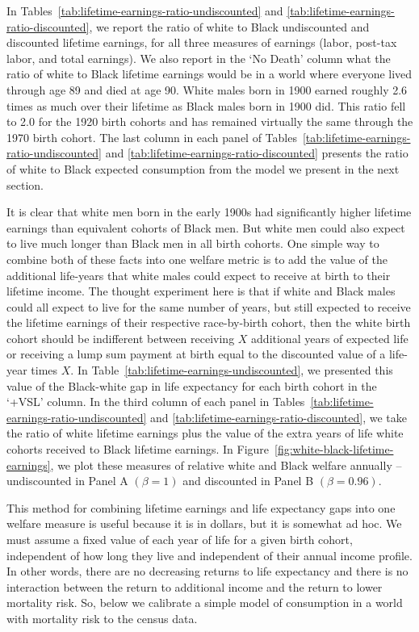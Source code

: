 \documentclass[12pt]{article}
\begin{document}
In Tables~\ref{tab:lifetime-earnings-ratio-undiscounted} and \ref{tab:lifetime-earnings-ratio-discounted}, we report the ratio of white to Black undiscounted and discounted lifetime earnings, for all three measures of earnings (labor, post-tax labor, and total earnings). 
We also report in the `No Death' column what the ratio of white to Black lifetime earnings would be in a world where everyone lived through age 89 and died at age 90. 
White males born in 1900 earned roughly 2.6 times as much over their lifetime as Black males born in 1900 did. 
This ratio fell to 2.0 for the 1920 birth cohorts and has remained virtually the same through the 1970 birth cohort. 
The last column in each panel of Tables~\ref{tab:lifetime-earnings-ratio-undiscounted} and \ref{tab:lifetime-earnings-ratio-discounted} presents the ratio of white to Black expected consumption from the model we present in the next section.

It is clear that white men born in the early 1900s had significantly higher lifetime earnings than equivalent cohorts of Black men. 
But white men could also expect to live much longer than Black men in all birth cohorts. 
One simple way to combine both of these facts into one welfare metric is to add the value of the additional life-years that white males could expect to receive at birth to their lifetime income. 
The thought experiment here is that if white and Black males could all expect to live for the same number of years, but still expected to receive the lifetime earnings of their respective race-by-birth cohort, then the white birth cohort should be indifferent between receiving $X$ additional years of expected life or receiving a lump sum payment at birth equal to the discounted value of a life-year times $X$. 
In Table~\ref{tab:lifetime-earnings-undiscounted}, we presented this value of the Black-white gap in life expectancy for each birth cohort in the `+VSL' column.
In the third column of each panel in Tables~\ref{tab:lifetime-earnings-ratio-undiscounted} and \ref{tab:lifetime-earnings-ratio-discounted}, we take the ratio of white lifetime earnings plus the value of the extra years of life white cohorts received to Black lifetime earnings. 
In Figure~\ref{fig:white-black-lifetime-earnings}, we plot these measures of relative white and Black welfare annually -- undiscounted in Panel A $(\beta = 1)$ and discounted in Panel B $(\beta = 0.96)$. 

This method for combining lifetime earnings and life expectancy gaps into one welfare measure is useful because it is in dollars, but it is somewhat ad hoc. 
We must assume a fixed value of each year of life for a given birth cohort, independent of how long they live and independent of their annual income profile. 
In other words, there are no decreasing returns to life expectancy and there is no interaction between the return to additional income and the return to lower mortality risk. 
So, below we calibrate a simple model of consumption in a world with mortality risk to the census data.
\end{document}
